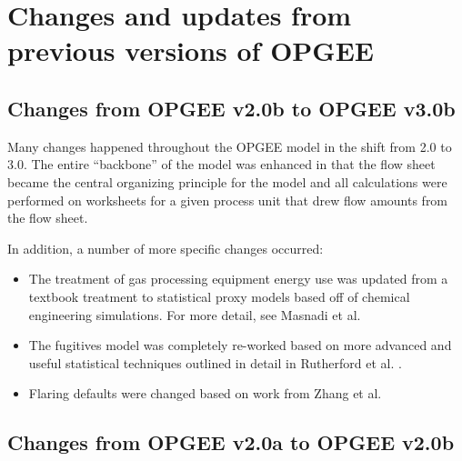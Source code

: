 \documentclass[11pt]{report}
\begin{document}

\chapter{Changes and updates from previous versions of OPGEE}




\section{Changes from OPGEE v2.0b to OPGEE v3.0b}

Many changes happened throughout the OPGEE model in the shift from 2.0 to 3.0. The entire ``backbone'' of the model was enhanced in that the flow sheet became the central organizing principle for the model and all calculations were performed on worksheets for a given process unit that drew flow amounts from the flow sheet.

In addition, a number of more specific changes occurred:
\begin{itemize}
\item The treatment of gas processing equipment energy use was updated from a textbook treatment to statistical proxy models based off of chemical engineering simulations. For more detail, see Masnadi et al. \cite{Masnadi2020}
\item The fugitives model was completely re-worked based on more advanced and useful statistical techniques outlined in detail in Rutherford et al. \cite{Rutherford2021}.
\item Flaring defaults were changed based on work from Zhang et al. \cite{Zhang2021}
\end{itemize}



\section{Changes from OPGEE v2.0a to OPGEE v2.0b}
\end{document}
